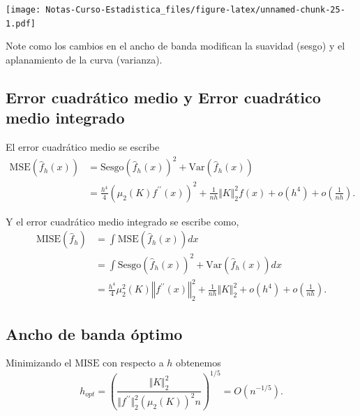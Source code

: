 \documentclass[
  12pt,
]{book}
\theoremstyle{definition}
\theoremstyle{definition}
\theoremstyle{definition}
\theoremstyle{remark}
\let\BeginKnitrBlock\begin \let\EndKnitrBlock\end
\begin{document}
\texttt{[image: Notas-Curso-Estadistica\_files/figure-latex/unnamed-chunk-25-1.pdf]}

\BeginKnitrBlock{remark}
{}Note como los cambios en el ancho de banda modifican la suavidad (sesgo) y el aplanamiento de la curva (varianza).
\EndKnitrBlock{remark}

\hypertarget{error-cuadruxe1tico-medio-y-error-cuadruxe1tico-medio-integrado}{%
\subsection{Error cuadrático medio y Error cuadrático medio integrado}\label{error-cuadruxe1tico-medio-y-error-cuadruxe1tico-medio-integrado}}

El error cuadrático medio se escribe
\begin{align*}
\mathrm{MSE}(\hat{f}_{h}(x))
& = \mathrm{Sesgo}\left(\hat{f}_{h}(x)\right)^{2} + \mathrm{Var}\left(\hat{f}_{h}(x)\right)                                                 \\
& = \frac{h^{4}}{4}\left(\mu_{2}(K)f^{\prime\prime}(x)\right)^{2}+\frac{1}{nh}\Vert K\Vert_{2}^{2}f(x)+o(h^{4})+o\left(\frac{1}{nh}\right).
\end{align*}

Y el error cuadrático medio integrado se escribe como,
\begin{align*}
\mathrm{MISE}\left(\hat{f}_{h}\right) & = \int \mathrm{MSE}\left(\hat{f}_{h}(x)\right)dx                                                                                                        \\
& = \int \mathrm{Sesgo}\left(\hat{f}_{h}(x)\right)^{2} + \mathrm{Var}\left(\hat{f}_{h}(x)\right)dx                                                        \\
& = \frac{h^{4}}{4}\mu_{2}^{2}(K)\left\Vert f^{\prime\prime}(x)\right\Vert_{2}^{2} +\frac{1}{nh}\Vert K\Vert_{2}^{2}+o(h^{4})+o\left(\frac{1}{nh}\right).
\end{align*}

\hypertarget{ancho-de-banda-uxf3ptimo}{%
\subsection{Ancho de banda óptimo}\label{ancho-de-banda-uxf3ptimo}}

Minimizando el \(\mathrm{MISE}\) con respecto a \(h\) obtenemos
\begin{equation*}
h_{opt}=\left(\frac{\Vert K\Vert_{2}^{2}}{\Vert f^{\prime\prime}\Vert_{2}^{2}\left(\mu_{2}(K)\right)^{2}n}\right)^{1/5}=O\left( n^{-1/5} \right).
\end{equation*}
\end{document}
